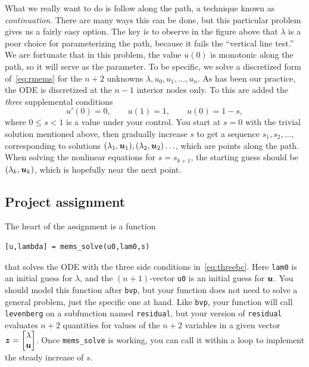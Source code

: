\documentclass[11pt,letterpaper]{article}
\begin{document}
What we really want to do is follow along the path, a technique known as \emph{continuation}. There are many ways this can be done, but this particular problem gives us a fairly easy option. The key is to observe in the figure above that $\lambda$ is a poor choice for parameterizing the path, because it fails the ``vertical line test.'' We are fortunate that in this problem, the value $u(0)$ is monotonic along the path, so it will serve as the parameter. To be specific, we solve a discretized form of~\eqref{eq:rmems} for the $n+2$ unknowns $\lambda,u_0,u_1,\ldots,u_n$. As has been our practice, the ODE is discretized at the $n-1$ interior nodes only. To this are added the \emph{three} supplemental conditions
\begin{equation}
  \label{eq:threebc}
  u'(0)=0, \qquad u(1)=1, \qquad u(0)=1-s,
\end{equation}
where $0\le s < 1$ is a value under your control. You start at $s=0$ with the trivial solution mentioned above, then gradually increase $s$ to get a sequence $s_1,s_2,\ldots$, corresponding to solutions $(\lambda_1,\bm{u}_1),(\lambda_2,\bm{u}_2)\ldots$, which are points along the path. When solving the nonlinear equations for $s=s_{k+1}$, the starting guess should be $(\lambda_k,\bm{u}_k)$, which is hopefully near the next point. 


\subsection*{Project assignment}
\label{sec:project-assignment}

The heart of the assignment is a function
\begin{verbatim}
[u,lambda] = mems_solve(u0,lam0,s)
\end{verbatim}
that solves the ODE with the three side conditions in~\eqref{eq:threebc}. Here \texttt{lam0} is an initial guess for $\lambda$, and the $(n+1)$-vector \texttt{u0} is an initial guess for $\bm{u}$. You should model this function after \texttt{bvp}, but your function does not need to solve a general problem, just the specific one at hand. Like \texttt{bvp}, your function will call \texttt{levenberg} on a subfunction named \texttt{residual}, but your version of \texttt{residual} evaluates $n+2$ quantities for values of the $n+2$ variables in a given vector $\bm{z}=
\begin{bmatrix}
  \lambda \\ \bm{u} 
\end{bmatrix}$. 
Once \verb!mems_solve! is working, you can call it within a loop to implement the steady increase of $s$. 
\end{document}
